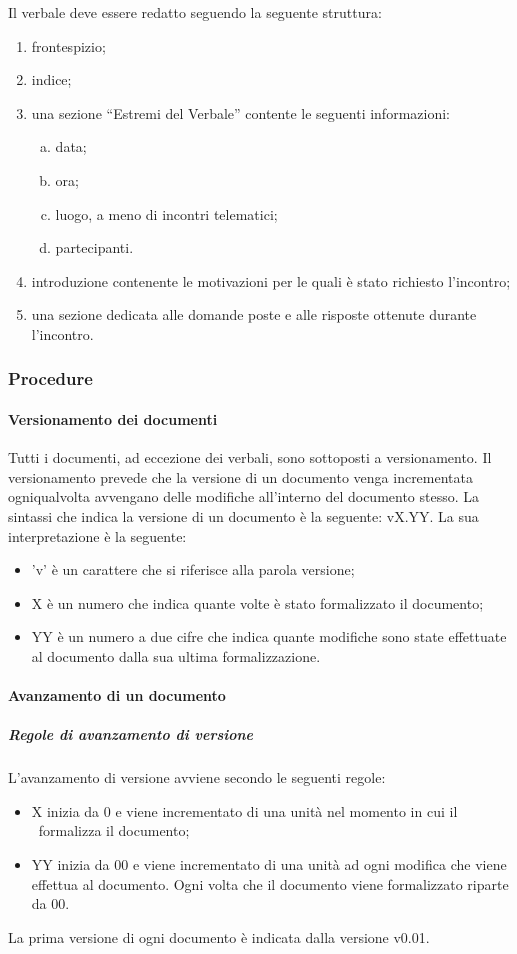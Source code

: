 \documentclass[../NormeProgetto.tex]{subfiles}
\begin{document}
				Il verbale deve essere redatto seguendo la seguente struttura:
				\begin{enumerate}
					\item frontespizio;
					\item indice;
					\item una sezione ``Estremi del Verbale'' contente le seguenti informazioni:
					\begin{enumerate}[a.]
						\item data;
						\item ora;
						\item luogo, a meno di incontri telematici;
						\item partecipanti.
					\end{enumerate}
					\item introduzione contenente le motivazioni per le quali è stato richiesto l'incontro;
					\item una sezione dedicata alle domande poste e alle risposte ottenute durante l'incontro.
				\end{enumerate}
		\subsubsection{Procedure}	
			\paragraph{Versionamento dei documenti} \label{sec:Versionamento dei documenti}
				Tutti i documenti, ad eccezione dei verbali, sono sottoposti a versionamento. Il versionamento prevede che la versione di un documento venga incrementata ogniqualvolta avvengano delle modifiche all'interno del documento stesso.
				La sintassi che indica la versione di un documento è la seguente: vX.YY. La sua interpretazione è la seguente:
				\begin{itemize}
					\item 'v' è un carattere che si riferisce alla parola versione;
					\item X è un numero che indica quante volte è stato formalizzato il documento;
					\item YY è un numero a due cifre che indica quante modifiche sono state effettuate al documento dalla sua ultima formalizzazione.
				\end{itemize}
			\paragraph{Avanzamento di un documento} 
				\subparagraph{Regole di avanzamento di versione}
					L'avanzamento di versione avviene secondo le seguenti regole:
					\begin{itemize}
						\item X inizia da 0 e viene incrementato di una unità nel momento in cui il \responsabilediprogetto\ formalizza il documento;
						\item YY inizia da 00 e viene incrementato di una unità ad ogni modifica che viene effettua al documento. Ogni volta che il documento viene formalizzato riparte da 00.
					\end{itemize}
					La prima versione di ogni documento è indicata dalla versione v0.01.		
				
\end{document}
